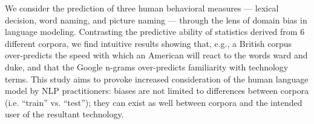 We consider the prediction of three human behavioral measures --- lexical decision, word naming, and picture naming --- through the lens of domain bias in language modeling. Contrasting the predictive ability of statistics derived from 6 different corpora, we find intuitive results showing that, e.g., a British corpus over-predicts the speed with which an American will react to the words ward and duke, and that the Google n-grams over-predicts familiarity with technology terms. This study aims to provoke increased consideration of the human language model by NLP practitioners: biases are not limited to differences between corpora (i.e. ``train'' vs. ``test''); they can exist as well between corpora and the intended user of the resultant technology.
